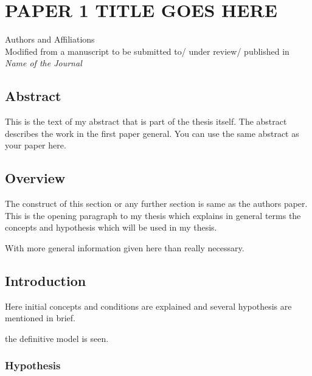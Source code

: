 \chapter{PAPER 1 TITLE GOES HERE}
\label{polymer_fibers}

\begin{center}
    Authors and Affiliations \\
    Modified from a manuscript to be submitted to/ under review/ published in \textit{Name of the Journal}
\end{center}

\section{Abstract}
This is the text of my abstract that is part of the thesis itself.
The abstract describes the work in the first paper general. You can use the same abstract as your paper here.



\section{Overview}

The  construct of this section or any further section is same as the authors paper.
This is the opening paragraph to my thesis which
explains in general terms the concepts and hypothesis
which will be used in my thesis.

With more general information given here than really
necessary.

\section{Introduction}

Here initial concepts and conditions are explained and
several hypothesis are mentioned in brief.

\autocite{kleeHellyTheoremIts1963} the definitive model is seen.

\subsection{Hypothesis}

